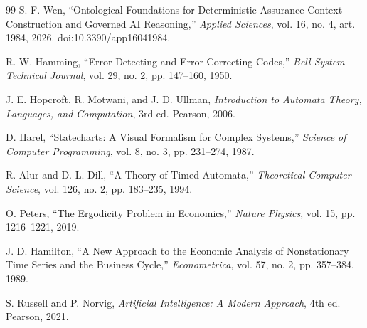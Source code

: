 \documentclass[11pt,a4paper]{article}
\begin{document}
\begin{thebibliography}{99}
S.-F. Wen, ``Ontological Foundations for Deterministic Assurance Context Construction and Governed AI Reasoning,'' \emph{Applied Sciences}, vol. 16, no. 4, art. 1984, 2026. doi:10.3390/app16041984.

R. W. Hamming, ``Error Detecting and Error Correcting Codes,'' \emph{Bell System Technical Journal}, vol. 29, no. 2, pp. 147--160, 1950.

J. E. Hopcroft, R. Motwani, and J. D. Ullman, \emph{Introduction to Automata Theory, Languages, and Computation}, 3rd ed. Pearson, 2006.

D. Harel, ``Statecharts: A Visual Formalism for Complex Systems,'' \emph{Science of Computer Programming}, vol. 8, no. 3, pp. 231--274, 1987.

R. Alur and D. L. Dill, ``A Theory of Timed Automata,'' \emph{Theoretical Computer Science}, vol. 126, no. 2, pp. 183--235, 1994.

O. Peters, ``The Ergodicity Problem in Economics,'' \emph{Nature Physics}, vol. 15, pp. 1216--1221, 2019.

J. D. Hamilton, ``A New Approach to the Economic Analysis of Nonstationary Time Series and the Business Cycle,'' \emph{Econometrica}, vol. 57, no. 2, pp. 357--384, 1989.

S. Russell and P. Norvig, \emph{Artificial Intelligence: A Modern Approach}, 4th ed. Pearson, 2021.
\end{thebibliography}
\end{document}
